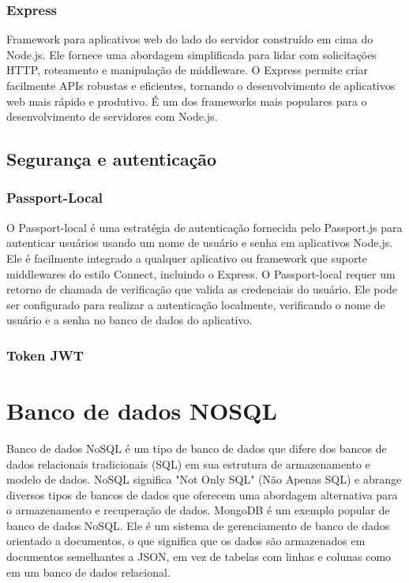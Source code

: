 \subsubsection{Express}
Framework para aplicativos web do lado do servidor construído em cima do Node.js. Ele fornece uma abordagem simplificada para lidar com solicitações HTTP, roteamento e manipulação de middleware. O Express permite criar facilmente APIs robustas e eficientes, tornando o desenvolvimento de aplicativos web mais rápido e produtivo. É um dos frameworks mais populares para o desenvolvimento de servidores com Node.js.

\subsection{Segurança e autenticação}

\subsubsection{Passport-Local}
O Passport-local é uma estratégia de autenticação fornecida pelo Passport.js para autenticar usuários usando um nome de usuário e senha em aplicativos Node.js. Ele é facilmente integrado a qualquer aplicativo ou framework que suporte middlewares do estilo Connect, incluindo o Express. O Passport-local requer um retorno de chamada de verificação que valida as credenciais do usuário. Ele pode ser configurado para realizar a autenticação localmente, verificando o nome de usuário e a senha no banco de dados do aplicativo. 

\subsubsection{Token JWT}



\section{Banco de dados NOSQL}
Banco de dados NoSQL é um tipo de banco de dados que difere dos bancos de dados relacionais tradicionais (SQL) em sua estrutura de armazenamento e modelo de dados. NoSQL significa "Not Only SQL" (Não Apenas SQL) e abrange diversos tipos de bancos de dados que oferecem uma abordagem alternativa para o armazenamento e recuperação de dados.
MongoDB é um exemplo popular de banco de dados NoSQL. Ele é um sistema de gerenciamento de banco de dados orientado a documentos, o que significa que os dados são armazenados em documentos semelhantes a JSON, em vez de tabelas com linhas e colunas como em um banco de dados relacional.

